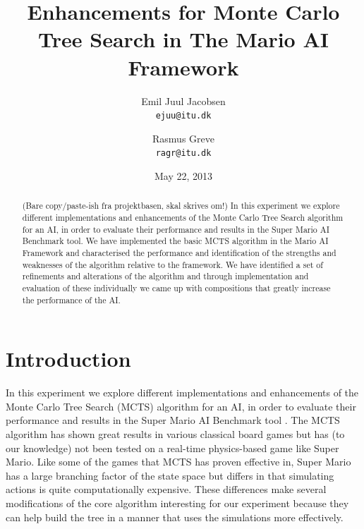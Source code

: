 \documentclass[10pt,a4paper]{article}
\begin{document}
\title{Enhancements for Monte Carlo Tree Search in The Mario AI Framework}
\date{May 22, 2013}
\author{Emil Juul Jacobsen\\\texttt{ejuu@itu.dk}        
        \and Rasmus Greve\\\texttt{ragr@itu.dk}}
\maketitle
\thispagestyle{empty} %

\begin{abstract}
(Bare copy/paste-ish fra projektbasen, skal skrives om!) %
In this experiment we explore different implementations and enhancements of the Monte Carlo Tree Search algorithm for an AI, in order to evaluate their performance and results in the Super Mario AI Benchmark tool. 
We have implemented the basic MCTS algorithm in the Mario AI 
Framework and characterised the performance and identification of 
the strengths and weaknesses of the algorithm relative to the 
framework. We have identified a set of refinements and alterations of the algorithm 
and through implementation and evaluation of these individually we came up
with compositions that greatly increase the performance of the AI.
\end{abstract}
\clearpage

\section{Introduction}
In this experiment we explore different implementations and enhancements of the Monte Carlo Tree Search (MCTS) algorithm for an AI, in order to evaluate their performance and results in the Super Mario AI Benchmark tool \cite{mario}. The MCTS algorithm has shown great results in various classical board games but has (to our knowledge) not been tested on a real-time physics-based game like Super Mario. Like some of the games that MCTS has proven effective in, Super Mario has a large branching factor of the state space but differs in that simulating actions is quite computationally expensive. These differences make several modifications of the core algorithm interesting for our experiment because they can help build the tree in a manner that uses the simulations more effectively. %
\clearpage
\end{document}
